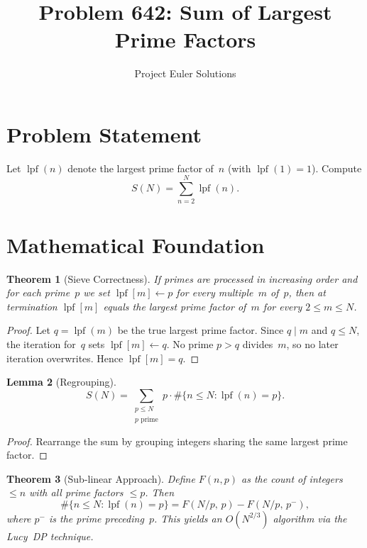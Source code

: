 \documentclass[11pt]{article}
\title{Problem 642: Sum of Largest Prime Factors}
\author{Project Euler Solutions}
\date{}
\newtheorem{theorem}{Theorem}
\newtheorem{lemma}[theorem]{Lemma}
\begin{document}
\maketitle

\section{Problem Statement}

Let $\operatorname{lpf}(n)$ denote the largest prime factor of~$n$ (with $\operatorname{lpf}(1)=1$). Compute
\[
S(N) = \sum_{n=2}^{N}\operatorname{lpf}(n).
\]

\section{Mathematical Foundation}

\begin{theorem}[Sieve Correctness]
If primes are processed in increasing order and for each prime~$p$ we set $\operatorname{lpf}[m]\leftarrow p$ for every multiple~$m$ of~$p$, then at termination $\operatorname{lpf}[m]$ equals the largest prime factor of~$m$ for every $2\le m\le N$.
\end{theorem}

\begin{proof}
Let $q=\operatorname{lpf}(m)$ be the true largest prime factor. Since $q\mid m$ and $q\le N$, the iteration for~$q$ sets $\operatorname{lpf}[m]\leftarrow q$. No prime $p>q$ divides~$m$, so no later iteration overwrites. Hence $\operatorname{lpf}[m]=q$.
\end{proof}

\begin{lemma}[Regrouping]
\[
S(N) = \sum_{\substack{p\le N\\p\text{ prime}}} p\cdot\#\{n\le N:\operatorname{lpf}(n)=p\}.
\]
\end{lemma}

\begin{proof}
Rearrange the sum by grouping integers sharing the same largest prime factor.
\end{proof}

\begin{theorem}[Sub-linear Approach]
Define $F(n,p)$ as the count of integers $\le n$ with all prime factors $\le p$. Then
\[
\#\{n\le N:\operatorname{lpf}(n)=p\} = F(N/p,\,p) - F(N/p,\,p^{-}),
\]
where $p^{-}$ is the prime preceding~$p$. This yields an $O(N^{2/3})$ algorithm via the Lucy~DP technique.
\end{theorem}
\end{document}
